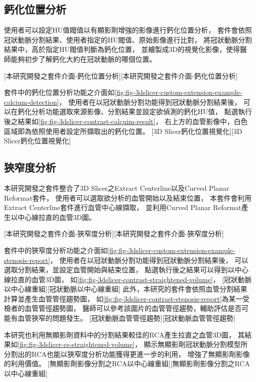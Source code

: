 \documentclass[class=NCU_thesis, crop=false]{standalone}
\begin{document}
\subsection{鈣化位置分析}
使用者可以設定HU值閥值以有顯影劑增強的影像進行鈣化位置分析，
套件會依照冠狀動脈分割結果、使用者指定的HU閥值、原始影像進行比對，
將冠狀動脈分割結果中，高於指定HU閥值判斷為鈣化位置，
並繪製成3D的視覺化影像，使得醫師能夠初步了解鈣化大約在冠狀動脈的哪個位置。

[本研究開發之套件介面-鈣化位置分析][本研究開發之套件介面-鈣化位置分析]

套件中的鈣化位置分析功能之介面如\cref{fig:fig-3dslicer-custom-extension-example-calcium-detection}，
使用者在以冠狀動脈分割功能得到冠狀動脈分割結果後，
可以在鈣化分析功能選取來源影像、分割結果並設定欲偵測的鈣化HU值，
點選執行後之結果如\cref{fig:fig-3dslicer-contrast-calcuim-result}，
右上方的血管影像中，白色區域即為依照使用者設定所擷取出的鈣化位置。
[3D Slicer鈣化位置視覺化][3D Slicer鈣化位置視覺化]

\subsection{狹窄度分析}
本研究開發之套件整合了3D Slicer之Extract Centerline以及Curved Planar Reformat套件，
使用者可以選取欲分析的血管開始以及結束位置，
本套件會利用Extract Centerline套件進行血管中心線擷取，
並利用Curved Planar Reformat產生以中心線拉直的血管3D圖。

[本研究開發之套件介面-狹窄度分析][本研究開發之套件介面-狹窄度分析]

套件中的狹窄度分析功能之介面如\cref{fig:fig-3dslicer-custom-extension-example-stenosis-report}，
使用者在以冠狀動脈分割功能得到冠狀動脈分割結果後，
可以選取分割結果，並設定血管開始與結束位置，
點選執行後之結果可以得到以中心線拉直的血管3D圖，
如\cref{fig:fig-3dslicer-contrast-straightened-volume}，
[冠狀動脈以中心線重組][冠狀動脈以中心線重組]
此外，本研究的套件會依照血管分割結果計算並產生血管管徑趨勢圖，
如\cref{fig:fig-3dslicer-contrast-stenosis-report}為某一受檢者的血管管徑趨勢圖，
醫師可以參考該圖片的血管管徑趨勢，輔助評估是否可能有血管狹窄的問題發生。
[冠狀動脈血管管徑趨勢][冠狀動脈血管管徑趨勢]

本研究也利用無顯影劑資料中的分割結果較佳的RCA產生拉直之血管3D圖，
其結果如\cref{fig:fig-3dslicer-cs-straightened-volume}，
顯示無顯影劑冠狀動脈分割模型所分割出的RCA也能以狹窄度分析功能獲得更進一步的利用，
增強了無顯影劑影像的利用價值。
[無顯影劑影像分割之RCA以中心線重組][無顯影劑影像分割之RCA以中心線重組]
\end{document}

